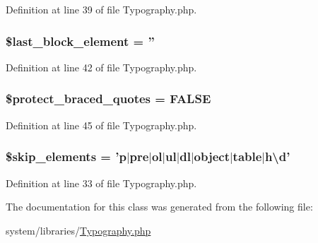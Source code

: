 Definition at line 39 of file Typography.\-php.

\hypertarget{class_c_i___typography_a8d5c4b7f2f7b74e118c682cf95688e22}{
\subsubsection[{\$last\-\_\-block\-\_\-element}]{\setlength{\rightskip}{0pt plus 5cm}\$last\-\_\-block\-\_\-element = ''}}\label{class_c_i___typography_a8d5c4b7f2f7b74e118c682cf95688e22}


Definition at line 42 of file Typography.\-php.

\hypertarget{class_c_i___typography_a6a74364571da23cc7187c864cde167ca}{
\subsubsection[{\$protect\-\_\-braced\-\_\-quotes}]{\setlength{\rightskip}{0pt plus 5cm}\$protect\-\_\-braced\-\_\-quotes = F\-A\-L\-S\-E}}\label{class_c_i___typography_a6a74364571da23cc7187c864cde167ca}


Definition at line 45 of file Typography.\-php.

\hypertarget{class_c_i___typography_a80c70a349bff88ad1ef94dea8753bc2e}{
\subsubsection[{\$skip\-\_\-elements}]{\setlength{\rightskip}{0pt plus 5cm}\$skip\-\_\-elements = 'p$|$pre$|$ol$|$ul$|$dl$|$object$|$table$|${\bf h\textbackslash{}d}'}}\label{class_c_i___typography_a80c70a349bff88ad1ef94dea8753bc2e}


Definition at line 33 of file Typography.\-php.



The documentation for this class was generated from the following file\-:\begin{DoxyCompactItemize}
\item 
system/libraries/\hyperlink{_typography_8php}{Typography.\-php}\end{DoxyCompactItemize}
